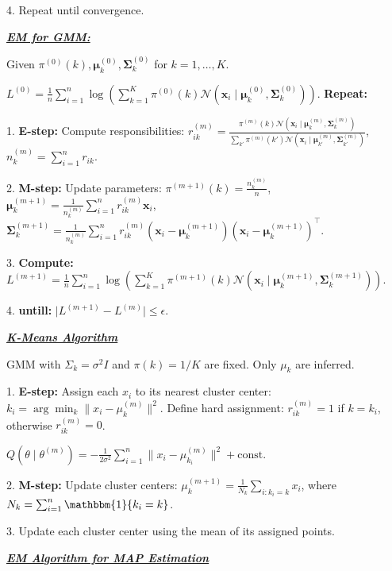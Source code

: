 \documentclass[10pt]{article}
\newcommand{\bulletPoint}[1]{\ul{\textit{\textbf{#1}}}}
\begin{document}
\begin{multicols*}{3}
4. Repeat until convergence.

\bulletPoint{EM for GMM:}\quad

Given $\pi^{(0)}(k), \boldsymbol{\mu}_k^{(0)}, \boldsymbol{\Sigma}_k^{(0)}$ for $k=1,\dots,K$. 

$L^{(0)} = \frac{1}{n} \sum_{i=1}^{n} \log \left( \sum_{k=1}^{K} \pi^{(0)}(k) \mathcal{N} (\mathbf{x}_i \mid \boldsymbol{\mu}_k^{(0)}, \boldsymbol{\Sigma}_k^{(0)}) \right)$. 
\textbf{Repeat:}

1. \textbf{E-step:} Compute responsibilities:
    $r_{ik}^{(m)} = \frac{\pi^{(m)}(k) \mathcal{N} (\mathbf{x}_i \mid \boldsymbol{\mu}_k^{(m)}, \boldsymbol{\Sigma}_k^{(m)})}{\sum_{k'} \pi^{(m)}(k') \mathcal{N} (\mathbf{x}_i \mid \boldsymbol{\mu}_{k'}^{(m)}, \boldsymbol{\Sigma}_{k'}^{(m)})}$,  
    $n_k^{(m)} = \sum_{i=1}^{n} r_{ik}$. 
    
2. \textbf{M-step:} Update parameters:
    $\pi^{(m+1)}(k) = \frac{n_k^{(m)}}{n}$,  \quad
    $\boldsymbol{\mu}_k^{(m+1)} = \frac{1}{n_k^{(m)}} \sum_{i=1}^{n} r_{ik}^{(m)} \mathbf{x}_i$,  \quad
    $\boldsymbol{\Sigma}_k^{(m+1)} = \frac{1}{n_k^{(m)}} \sum_{i=1}^{n} r_{ik}^{(m)} (\mathbf{x}_i - \boldsymbol{\mu}_k^{(m+1)})(\mathbf{x}_i - \boldsymbol{\mu}_k^{(m+1)})^\top$. 

3. \textbf{Compute:}
    $L^{(m+1)} = \frac{1}{n} \sum_{i=1}^{n} \log \left( \sum_{k=1}^{K} \pi^{(m+1)}(k) \mathcal{N} (\mathbf{x}_i \mid \boldsymbol{\mu}_k^{(m+1)}, \boldsymbol{\Sigma}_k^{(m+1)}) \right)$. 

4. \textbf{untill:} $\lvert L^{(m+1)} - L^{(m)} \rvert \leq \epsilon$.
    

\bulletPoint{K-Means Algorithm}\quad

GMM with $\Sigma_k = \sigma^2 I$ and $\pi(k) = 1/K$ are fixed. Only $\mu_k$ are inferred. 

1. \textbf{E-step:} Assign each $x_i$ to its nearest cluster center: $k_i = \arg\min_{k} \|x_i - \mu_k^{(m)}\|^2$. Define hard assignment: $r_{ik}^{(m)} = 1$ if $k = k_i$, otherwise $r_{ik}^{(m)} = 0$. 

$Q(\theta \mid \theta^{(m)}) = -\frac{1}{2\sigma^2} \sum_{i=1}^{n} \|x_i - \mu_{k_i}^{(m)}\|^2 + \text{const}$. 

2. \textbf{M-step:} Update cluster centers: $\mu_k^{(m+1)} = \frac{1}{N_k} \sum_{i:k_i=k} x_i$, where $N_k = \sum_{i=1}^{n} \mathbbm{1}\{ k_i = k \}$. 

3. Update each cluster center using the mean of its assigned points.
    
\bulletPoint{EM Algorithm for MAP Estimation}\quad


\end{multicols*}
\end{document}
